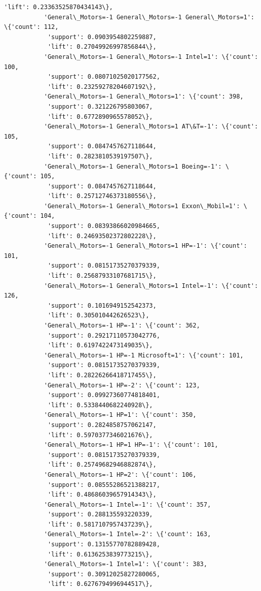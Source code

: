 \documentclass[11pt]{article}
\begin{document}
\begin{Verbatim}[commandchars=\\\{\}]
            'lift': 0.23363525870434143\},
           'General\_Motors=-1 General\_Motors=-1 General\_Motors=1': \{'count': 112,
            'support': 0.0903954802259887,
            'lift': 0.27049926997856844\},
           'General\_Motors=-1 General\_Motors=-1 Intel=1': \{'count': 100,
            'support': 0.08071025020177562,
            'lift': 0.23259278204607192\},
           'General\_Motors=-1 General\_Motors=1': \{'count': 398,
            'support': 0.321226795803067,
            'lift': 0.6772890965578052\},
           'General\_Motors=-1 General\_Motors=1 AT\&T=-1': \{'count': 105,
            'support': 0.0847457627118644,
            'lift': 0.2823810539197507\},
           'General\_Motors=-1 General\_Motors=1 Boeing=-1': \{'count': 105,
            'support': 0.0847457627118644,
            'lift': 0.25712746373180556\},
           'General\_Motors=-1 General\_Motors=1 Exxon\_Mobil=1': \{'count': 104,
            'support': 0.08393866020984665,
            'lift': 0.24693502372802228\},
           'General\_Motors=-1 General\_Motors=1 HP=-1': \{'count': 101,
            'support': 0.08151735270379339,
            'lift': 0.25687933107681715\},
           'General\_Motors=-1 General\_Motors=1 Intel=-1': \{'count': 126,
            'support': 0.1016949152542373,
            'lift': 0.305010442626523\},
           'General\_Motors=-1 HP=-1': \{'count': 362,
            'support': 0.29217110573042776,
            'lift': 0.6197422473149035\},
           'General\_Motors=-1 HP=-1 Microsoft=1': \{'count': 101,
            'support': 0.08151735270379339,
            'lift': 0.28226266418717455\},
           'General\_Motors=-1 HP=-2': \{'count': 123,
            'support': 0.09927360774818401,
            'lift': 0.5338440682240928\},
           'General\_Motors=-1 HP=1': \{'count': 350,
            'support': 0.2824858757062147,
            'lift': 0.5970377346021676\},
           'General\_Motors=-1 HP=1 HP=-1': \{'count': 101,
            'support': 0.08151735270379339,
            'lift': 0.25749682946882874\},
           'General\_Motors=-1 HP=2': \{'count': 106,
            'support': 0.08555286521388217,
            'lift': 0.48686039657914343\},
           'General\_Motors=-1 Intel=-1': \{'count': 357,
            'support': 0.288135593220339,
            'lift': 0.5817107957437239\},
           'General\_Motors=-1 Intel=-2': \{'count': 163,
            'support': 0.13155770782889428,
            'lift': 0.6136253839773215\},
           'General\_Motors=-1 Intel=1': \{'count': 383,
            'support': 0.30912025827280065,
            'lift': 0.6276794996944517\},

\end{Verbatim}
\end{document}
